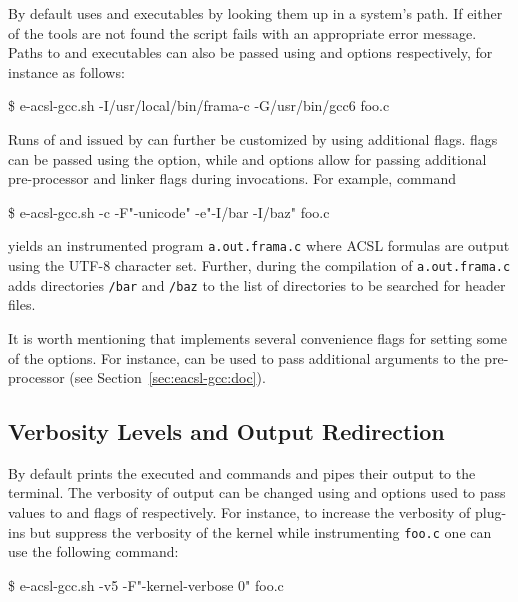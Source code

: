 By default \eacslgcc uses  and  executables by looking them
up in a system's path. If either of the tools are not found the script fails
with an appropriate error message. Paths to \framac and \gcc executables can
also be passed using  and  options
respectively, for instance as follows:

\begin{shell}
\$ e-acsl-gcc.sh -I/usr/local/bin/frama-c -G/usr/bin/gcc6 foo.c
\end{shell}

Runs of \framac and \gcc issued by \eacslgcc can further be customized by using
additional flags.  \framac flags can be passed using the  option,
while  and  options allow for passing additional
pre-processor and linker flags during \gcc invocations.  For example, command

\begin{shell}
\$ e-acsl-gcc.sh -c -F"-unicode" -e"-I/bar -I/baz" foo.c
\end{shell}

yields an instrumented program \texttt{a.out.frama.c} where ACSL formulas
are output using the UTF-8 character set. Further, during the compilation of
\texttt{a.out.frama.c} \gcc adds directories \texttt{/bar} and
\texttt{/baz} to the list of directories to be searched for header files.

It is worth mentioning that \eacslgcc implements several convenience flags for
setting some of the \framac options. For instance,  can be used to
pass additional arguments to the \framac pre-processor (see
Section~\ref{sec:eacsl-gcc:doc}).

\subsection{Verbosity Levels and Output Redirection}

By default \eacslgcc prints the executed \framac and \gcc commands and pipes
their output to the terminal. The verbosity of \framac output can be changed
using  and  options used to pass values to
 and  flags of \framac respectively.  For
instance, to increase the verbosity of plug-ins but suppress the verbosity of
the \framac kernel while instrumenting \texttt{foo.c} one can use the following
command:

\begin{shell}
\$ e-acsl-gcc.sh -v5 -F"-kernel-verbose 0" foo.c
\end{shell}

